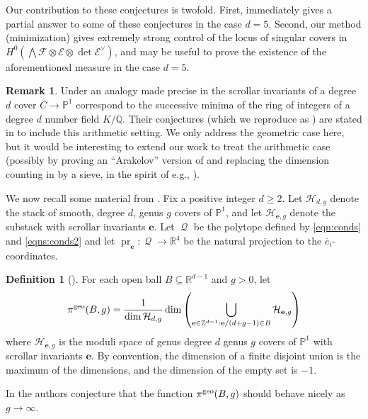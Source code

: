 \documentclass[11pt]{amsart}
\numberwithin{theorem}{section}
\numberwithin{equation}{section}
\theoremstyle{definition}\newtheorem{defn}[theorem]{Definition}
\theoremstyle{definition}\newtheorem{remark}[theorem]{Remark}
\theoremstyle{definition}\newtheorem{question}[theorem]{Question}
\theoremstyle{definition}\newtheorem{problem}[theorem]{Problem}
\newcommand{\RR}{\mathbb{R}}
\newcommand{\ZZ}{\mathbb{Z}}
\newcommand{\QQ}{\mathbb{Q}}
\newcommand{\PP}{\mathbb{P}}
\newcommand{\cE}{\mathcal{E}}
\newcommand{\cF}{\mathcal{F}}
\newcommand{\ove}{\overline{e}}
\DeclareMathOperator{\qpolytope}{\mathcal{Q}}
\DeclareMathOperator{\pr}{pr}
\renewcommand{\subset}{\subseteq}
\begin{document}
Our contribution to these conjectures is twofold. First,  immediately gives a partial answer to some of these conjectures in the case $d = 5$. Second, our method (minimization) gives extremely strong control of the locus of singular covers in $H^0(\bigwedge \cF \otimes \cE \otimes \det \cE^{\vee})$, and may be useful to prove the existence of the aforementioned measure in the case $d = 5$.

\begin{remark}
  Under an analogy made precise in \cite[Section~8]{VV} the scrollar invariants of a degree $d$ cover $C \to \PP^1$ correspond to the successive minima of the ring of integers of a degree $d$ number field $K/\QQ$. Their conjectures (which we reproduce as ) are stated in \cite{VV} to include this arithmetic setting.  We only address the geometric case here, but it would be interesting to extend our work to treat the arithmetic case (possibly by proving an ``Arakelov'' version of  and replacing the dimension counting in  by a sieve, in the spirit of e.g., \cite{B-quinticdiscs}).
\end{remark}

We now recall some material from \cite[Section~8]{VV}. Fix a positive integer $d \geq 2$. Let $\mathcal{H}_{d,g}$ denote the stack of smooth, degree $d$, genus $g$ covers of $\PP^1$, and let $\mathcal{H}_{\mathbf{e},g}$ denote the substack with scrollar invariants $\mathbf{e}$. Let $\qpolytope$ be the polytope defined by \eqref{eqn:conds} and \eqref{eqns:conds2} and let $\pr_{\mathbf{e}} : \qpolytope \rightarrow \RR^4$ be the natural projection to the $\ove_i$-coordinates.

\begin{defn}[{\cite[Definition~8.2]{VV}}]
For each open ball $B \subset \RR^{d-1}$ and $g>0$, let 
\[\pi^{\textnormal{geo}}(B,g) = \frac{1}{\dim \mathcal{H}_{d,g}}\dim  \left ( \bigcup_{\mathbf{e} \in \ZZ^{d-1} : \mathbf{e}/(d+g-1) \in B}    \mathcal{H}_{\mathbf{e},g} \right )\]
where $\mathcal{H}_{\mathbf{e}, g}$ is the moduli space of genus degree $d$ genus $g$ covers of $\PP^1$  with scrollar invariants $\mathbf{e}$. By convention, the dimension of a finite disjoint union is the maximum of the dimensions, and the dimension of the empty set is $-1$. 
\end{defn}

In \cite{VV} the authors conjecture that the function $\pi^{\textnormal{geo}}(B,g)$ should behave nicely as $g \rightarrow \infty$.
\end{document}
